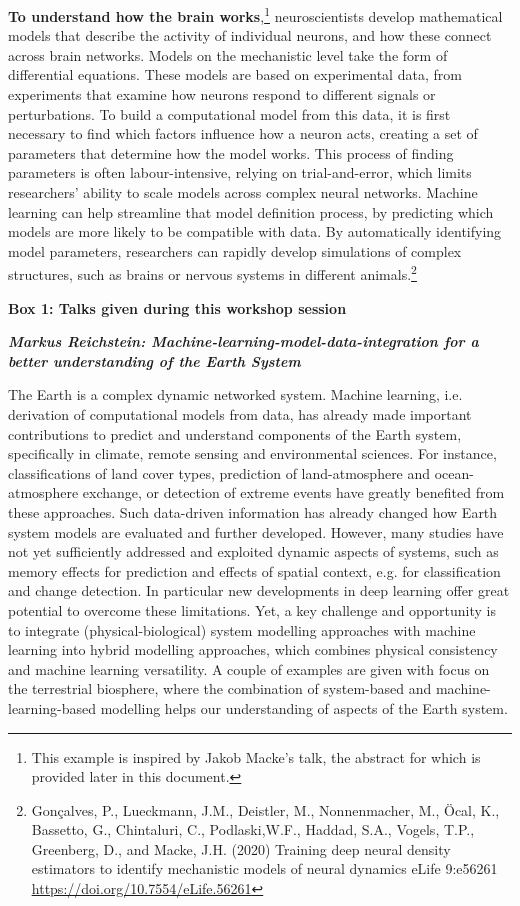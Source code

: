 {\textbf{To understand how the brain works},\footnote{This example is
  inspired by Jakob Macke's talk, the abstract for which is provided
  later in this document.} neuroscientists develop mathematical models
that describe the activity of individual neurons, and how these connect
across brain networks. Models on the mechanistic level take the form of
differential equations. These models are based on experimental data,
from experiments that examine how neurons respond to different signals
or perturbations. To build a computational model from this data, it is
first necessary to find which factors influence how a neuron acts,
creating a set of parameters that determine how the model works. This
process of finding parameters is often labour-intensive, relying on
trial-and-error, which limits researchers' ability to scale models
across complex neural networks. Machine learning can help streamline
that model definition process, by predicting which models are more
likely to be compatible with data. By automatically identifying model
parameters, researchers can rapidly develop simulations of complex
structures, such as brains or nervous systems in different
animals.\footnote{Gonçalves, P., Lueckmann, J.M., Deistler, M.,
  Nonnenmacher, M., Öcal, K., Bassetto, G., Chintaluri, C.,
  Podlaski,W.F., Haddad, S.A., Vogels, T.P., Greenberg, D., and Macke,
  J.H. (2020) Training deep neural density estimators to identify
  mechanistic models of neural dynamics eLife 9:e56261
  \href{https://doi.org/10.7554/eLife.56261}{\uline{https://doi.org/10.7554/eLife.56261}}}

\textbf{Box 1: Talks given during this workshop session}

\emph{\textbf{Markus Reichstein: Machine-learning-model-data-integration
for a better understanding of the Earth System}}

The Earth is a complex dynamic networked system. Machine learning, i.e.
derivation of computational models from data, has already made important
contributions to predict and understand components of the Earth system,
specifically in climate, remote sensing and environmental sciences. For
instance, classifications of land cover types, prediction of
land-atmosphere and ocean-atmosphere exchange, or detection of extreme
events have greatly benefited from these approaches. Such data-driven
information has already changed how Earth system models are evaluated
and further developed. However, many studies have not yet sufficiently
addressed and exploited dynamic aspects of systems, such as memory
effects for prediction and effects of spatial context, e.g. for
classification and change detection. In particular new developments in
deep learning offer great potential to overcome these limitations. Yet,
a key challenge and opportunity is to integrate (physical-biological)
system modelling approaches with machine learning into hybrid modelling
approaches, which combines physical consistency and machine learning
versatility. A couple of examples are given with focus on the
terrestrial biosphere, where the combination of system-based and
machine-learning-based modelling helps our understanding of aspects of
the Earth system.

}
